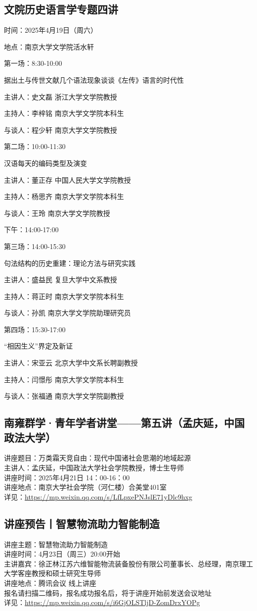 \documentclass[letterpaper, 12pt]{article}
\begin{document}
\begin{multicols}{2}
\subsection{文院历史语言学专题四讲}
时间：2025年4月19日（周六）

地点：南京大学文学院活水轩

第一场：8:30-10:00

据出土与传世文献几个语法现象谈谈《左传》语言的时代性

主讲人：史文磊 浙江大学文学院教授

主持人：李梓铭 南京大学文学院本科生

与谈人：程少轩 南京大学文学院教授

第二场：10:00-11:30

汉语{每天}的编码类型及演变

主讲人：董正存 中国人民大学文学院教授

主持人：杨思齐 南京大学文学院本科生

与谈人：王玲 南京大学文学院教授

下午：14:00-17:00

第三场：14:00-15:30

句法结构的历史重建：理论方法与研究实践

主讲人：盛益民 复旦大学中文系教授

主持人：蒋正时 南京大学文学院本科生

与谈人：孙凯 南京大学文学院助理研究员

第四场：15:30-17:00

“相因生义”界定及新证

主讲人：宋亚云 北京大学中文系长聘副教授

主持人：闫憬彤 南京大学文学院本科生

与谈人：张福通 南京大学文学院副教授

\subsection{南雍群学·青年学者讲堂——第五讲（孟庆延，中国政法大学）}
讲座题目：万类霜天竞自由：现代中国诸社会思潮的地域起源
\\主讲人：孟庆延，中国政法大学社会学院教授，博士生导师
\\讲座时间：2025年4月21日 14：00-16：00
\\讲座地点：南京大学社会学院（河仁楼）合美堂401室
\\详见：\url{https://mp.weixin.qq.com/s/LfLpxePNJslE71yDlc9hxg}

\subsection{讲座预告丨智慧物流助力智能制造}
讲座主题：智慧物流助力智能制造
\\讲座时间：4月23日（周三）20:00开始
\\主讲嘉宾：徐正林江苏六维智能物流装备股份有限公司董事长、总经理，南京理工大学客座教授和硕士研究生导师
\\讲座地点：腾讯会议 线上讲座
\\报名请扫描二维码，报名成功报名后，将于讲座开始前发送会议地址
\\详见：\url{https://mp.weixin.qq.com/s/i6GjOLSTljD-ZomDrxYOPg}


\end{multicols}
\end{document}
